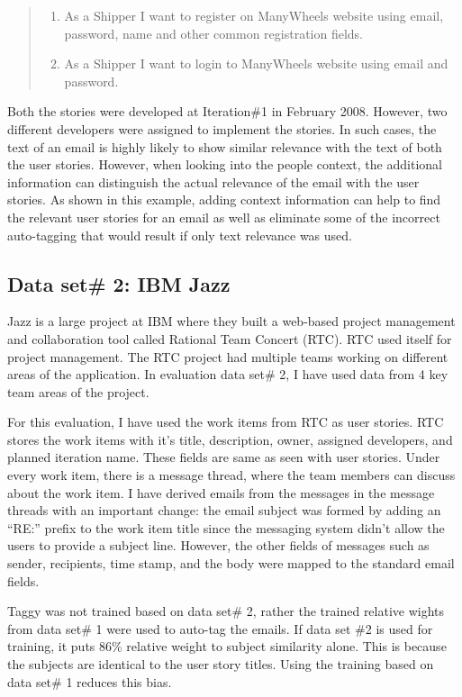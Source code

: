 \begin{quote}
	\begin{enumerate}
		\item As a Shipper I want to register on ManyWheels website using email, password, name and other common registration fields.
		\item As a Shipper I want to login to ManyWheels website using email and password.
	\end{enumerate}
\end{quote}

Both the stories were developed at Iteration\#1 in February 2008. However, two different developers were assigned to implement the stories. In such cases, the text of an email is highly likely to show similar relevance with the text of both the user stories. However, when looking into the people context, the additional information can distinguish the actual relevance of the email with the user stories. As shown in this example, adding context information can help to find the relevant user stories for an email as well as eliminate some of the incorrect auto-tagging that would result if only text relevance was used.

\subsection{Data set\# 2: IBM Jazz}
Jazz is a large project at IBM where they built a web-based project management and collaboration tool called Rational Team Concert (RTC). RTC used itself for project management. The RTC project had multiple teams working on different areas of the application. In evaluation data set\# 2, I have used data from 4 key team areas of the project.

For this evaluation, I have used the work items from RTC as user stories. RTC stores the work items with it's title, description, owner, assigned developers, and planned iteration name. These fields are same as seen with user stories. Under every work item, there is a message thread, where the team members can discuss about the work item. I have derived emails from the messages in the message threads with an important change: the email subject was formed by adding an ``RE:'' prefix to the work item title since the messaging system didn't allow the users to provide a subject line. However, the other fields of messages such as sender, recipients, time stamp, and the body were mapped to the standard email fields.

Taggy was not trained based on data set\# 2, rather the trained relative wights from data set\# 1 were used to auto-tag the emails. If data set \#2 is used for training, it puts 86\% relative weight to subject similarity alone. This is because the subjects are identical to the user story titles.  Using the training based on data set\# 1 reduces this bias.


